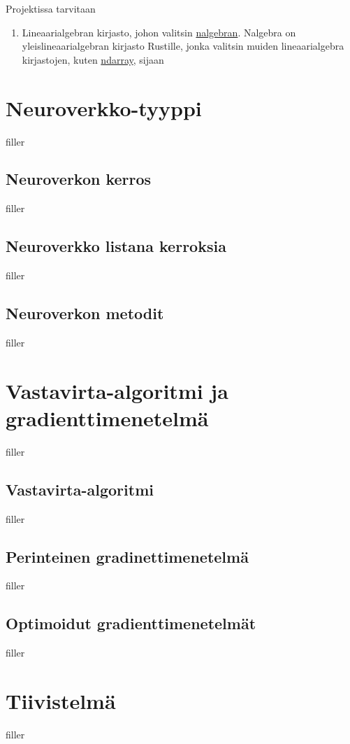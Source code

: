 \documentclass{article}
\begin{document}
Projektissa tarvitaan
\begin{enumerate}
    \item Lineaarialgebran kirjasto, johon valitsin \href{https://nalgebra.org/}{nalgebran}.
          Nalgebra on yleislineaarialgebran kirjasto Rustille, jonka valitsin muiden lineaarialgebra kirjastojen, kuten \href{https://docs.rs/ndarray/latest/ndarray/}{ndarray}, sijaan
\end{enumerate}


\section{Neuroverkko-tyyppi}

filler

\subsection{Neuroverkon kerros}

filler

\subsection{Neuroverkko listana kerroksia}

filler

\subsection{Neuroverkon metodit}

filler

\section{Vastavirta-algoritmi ja gradienttimenetelmä}

filler

\subsection{Vastavirta-algoritmi}

filler

\subsection{Perinteinen gradinettimenetelmä}

filler

\subsection{Optimoidut gradienttimenetelmät}

filler

\section{Tiivistelmä}

filler

\printbibliography
\end{document}
